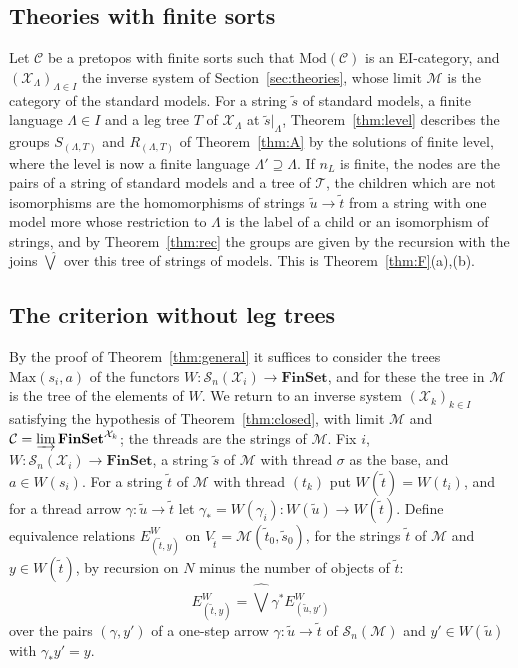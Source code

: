 \documentclass[11pt]{amsart}
\theoremstyle{definition}
\newcommand{\Fin}{\mathbf{FinSet}}
\newcommand{\Mod}{\mathrm{Mod}}
\newcommand{\Max}{\mathrm{Max}}
\newcommand{\cX}{\mathcal X}
\newcommand{\cC}{\mathcal C}
\newcommand{\cM}{\mathcal M}
\newcommand{\cS}{\mathcal S}
\begin{document}
\subsection*{Theories with finite sorts}
Let $\cC$ be a pretopos with finite sorts such that $\Mod(\cC)$ is an
EI-category, and $(\cX_\Lambda)_{\Lambda\in I}$ the inverse system of
Section~\ref{sec:theories}, whose limit $\cM$ is the category of the
standard models. For a string $\tilde s$ of standard models, a finite
language $\Lambda\in I$ and a leg tree $T$ of $\cX_\Lambda$ at
$\tilde s|_\Lambda$, Theorem~\ref{thm:level} describes the groups
$S_{(\Lambda,T)}$ and $R_{(\Lambda,T)}$ of Theorem~\ref{thm:A} by the
solutions of finite level, where the level is now a finite language
$\Lambda'\supseteq\Lambda$. If $n_L$ is finite, the nodes are the
pairs of a string of standard models and a tree of $\mathcal T$, the
children which are not isomorphisms are the homomorphisms of strings
$\tilde u\to\tilde t$ from a string with one model more whose
restriction to $\Lambda$ is the label of a child or an isomorphism of
strings, and by Theorem~\ref{thm:rec} the groups are given by the
recursion with the joins $\widehat\bigvee$ over this tree of strings
of models. This is Theorem~\ref{thm:F}(a),(b).

\subsection*{The criterion without leg trees}
By the proof of Theorem~\ref{thm:general} it suffices to consider the
trees $\Max(s_i,a)$ of the functors $W\colon\cS_n(\cX_i)\to\Fin$, and
for these the tree in $\cM$ is the tree of the elements of $W$. We
return to an inverse system $(\cX_k)_{k\in I}$ satisfying the
hypothesis of Theorem~\ref{thm:closed}, with limit $\cM$ and
$\cC=\varinjlim\Fin^{\cX_k}$; the threads are the strings of $\cM$.
Fix $i$, $W\colon\cS_n(\cX_i)\to\Fin$, a string $\tilde s$ of $\cM$
with thread $\sigma$ as the base, and $a\in W(s_i)$. For a string
$\tilde t$ of $\cM$ with thread $(t_k)$ put $W(\tilde t)=W(t_i)$, and
for a thread arrow $\gamma\colon\tilde u\to\tilde t$ let
$\gamma_*=W(\gamma_i)\colon W(\tilde u)\to W(\tilde t)$. Define
equivalence relations $E^W_{(\tilde t,y)}$ on $V_{\tilde
t}=\cM(\tilde t_0,\tilde s_0)$, for the strings $\tilde t$ of $\cM$
and $y\in W(\tilde t)$, by recursion on $N$ minus the number of
objects of $\tilde t$:
\begin{equation}\label{eq:EW}
E^W_{(\tilde t,y)}=\widehat\bigvee\gamma^*E^W_{(\tilde u,y')}
\end{equation}
over the pairs $(\gamma,y')$ of a one-step arrow $\gamma\colon\tilde
u\to\tilde t$ of $\cS_n(\cM)$ and $y'\in W(\tilde u)$ with
$\gamma_*y'=y$.
\end{document}
